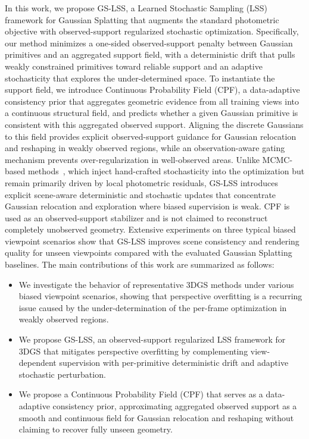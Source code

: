 \documentclass[lettersize,journal]{IEEEtran}
\begin{document}
In this work, we propose GS-LSS, a Learned Stochastic Sampling (LSS) framework for Gaussian Splatting that augments the standard photometric objective with observed-support regularized stochastic optimization.
Specifically, our method minimizes a one-sided observed-support penalty between Gaussian primitives and an aggregated support field, with a deterministic drift that pulls weakly constrained primitives toward reliable support and an adaptive stochasticity that explores the under-determined space.
To instantiate the support field, we introduce Continuous Probability Field (CPF), a data-adaptive consistency prior that aggregates geometric evidence from all training views into a continuous structural field, and predicts whether a given Gaussian primitive is consistent with this aggregated observed support. 
Aligning the discrete Gaussians to this field provides explicit observed-support guidance for Gaussian relocation and reshaping in weakly observed regions, while an observation-aware gating mechanism prevents over-regularization in well-observed areas.
Unlike MCMC-based methods~\cite{mcmc,mh3dgs}, which inject hand-crafted stochasticity into the optimization but remain primarily driven by local photometric residuals, GS-LSS introduces explicit scene-aware deterministic and stochastic updates that concentrate Gaussian relocation and exploration where biased supervision is weak. CPF is used as an observed-support stabilizer and is not claimed to reconstruct completely unobserved geometry.
Extensive experiments on three typical biased viewpoint scenarios show that GS-LSS improves scene consistency and rendering quality for unseen viewpoints compared with the evaluated Gaussian Splatting baselines.
The main contributions of this work are summarized as follows:
\begin{itemize}
    \item We investigate the behavior of representative 3DGS methods under various biased viewpoint scenarios, showing that perspective overfitting is a recurring issue caused by the under-determination of the per-frame optimization in weakly observed regions.
    \item We propose GS-LSS, an observed-support regularized LSS framework for 3DGS that mitigates perspective overfitting by complementing view-dependent supervision with per-primitive deterministic drift and adaptive stochastic perturbation.
    \item We propose a Continuous Probability Field (CPF) that serves as a data-adaptive consistency prior, approximating aggregated observed support as a smooth and continuous field for Gaussian relocation and reshaping without claiming to recover fully unseen geometry.
\end{itemize}
\end{document}
